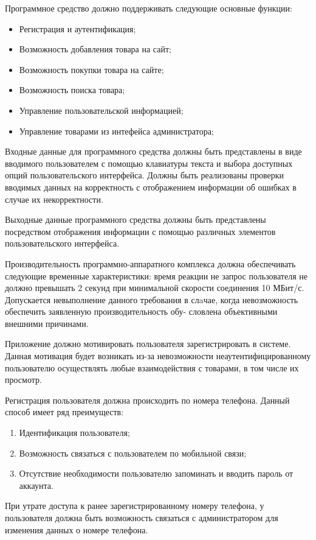 Программное средство должно поддерживать следующие основные функции:
\begin{itemize}
  \item Регистрация и аутентификация;
  \item Возможность добавления товара на сайт;
  \item Возможность покупки товара на сайте;
  \item Возможность поиска товара;
  \item Управление пользовательской информацией;
  \item Управление товарами из интефейса администратора;
\end{itemize}


Входные данные для программного средства должны быть представлены в виде вводимого пользователем с помощью клавиатуры текста и выбора доступных опций пользовательского интерфейса.
Должны быть реализованы проверки вводимых данных на корректность с отображением информации об ошибках в случае их некорректности.


Выходные данные программного средства должны быть представлены посредством отображения информации с помощью различных элементов пользовательского интерфейса.


Производительность программно-аппаратного комплекса должна обеспечивать следующие временные характеристики: время реакции не запрос пользователя не должно превышать 2 секунд при минимальной скорости соединения 10 МБит/с.
Допускается невыполнение данного требования в слaчае, когда невозможность обеспечить заявленную производительность обу- словлена объективными внешними причинами.


Приложение должно мотивировать пользователя зарегистрировать в системе.
Данная мотивация будет возникать из-за невозможности неаутентифицированному пользователю осуществлять любые взаимодействия с товарами, в том числе их просмотр.

Регистрация пользователя должна происходить по номера телефона. Данный способ имеет ряд преимуществ:
\begin{enumerate}
    \item Идентификация пользователя;
    \item Возможность связаться с пользователем по мобильной связи;
    \item Отсутствие необходимости пользователю запоминать и вводить пароль от аккаунта.
\end{enumerate}

При утрате доступа к ранее зарегистрированному номеру телефона, у пользователя должна быть возможность связаться с администратором для изменения данных о номере телефона.

